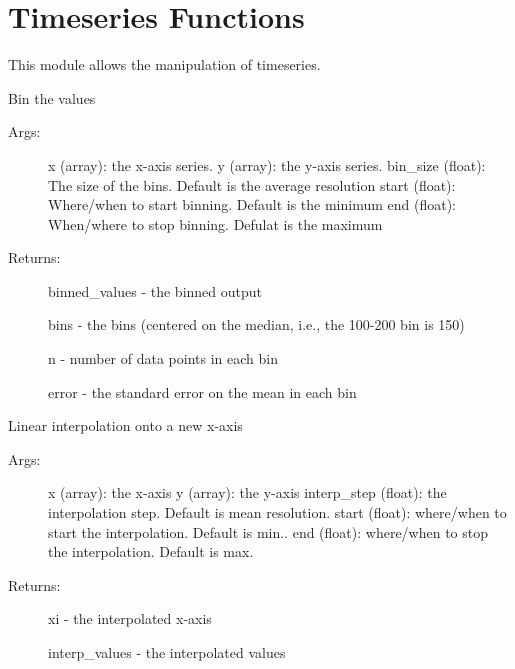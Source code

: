 \documentclass[letterpaper,10pt,english]{sphinxmanual}
\begin{document}
\chapter{Timeseries Functions}
\label{\detokenize{Timeseries:timeseries-functions}}\label{\detokenize{Timeseries::doc}}
This module allows the manipulation of timeseries.

\begin{fulllineitems}
\label{\detokenize{Timeseries:pyleoclim.Timeseries.binvalues}}
Bin the values
\begin{description}
\item[{Args:}] \leavevmode
x (array): the x-axis series.
y (array): the y-axis series.
bin\_size (float): The size of the bins. Default is the average resolution
start (float): Where/when to start binning. Default is the minimum
end (float): When/where to stop binning. Defulat is the maximum

\item[{Returns:}] \leavevmode
binned\_values - the binned output

bins - the bins (centered on the median, i.e., the 100-200 bin is 150)

n - number of data points in each bin

error -  the standard error on the mean in each bin

\end{description}

\end{fulllineitems}


\begin{fulllineitems}
\label{\detokenize{Timeseries:pyleoclim.Timeseries.interp}}
Linear interpolation onto a new x-axis
\begin{description}
\item[{Args:}] \leavevmode
x (array): the x-axis
y (array): the y-axis
interp\_step (float): the interpolation step. Default is mean resolution.
start (float): where/when to start the interpolation. Default is min..
end (float): where/when to stop the interpolation. Default is max.

\item[{Returns:}] \leavevmode
xi - the interpolated x-axis

interp\_values - the interpolated values

\end{description}

\end{fulllineitems}
\end{document}
